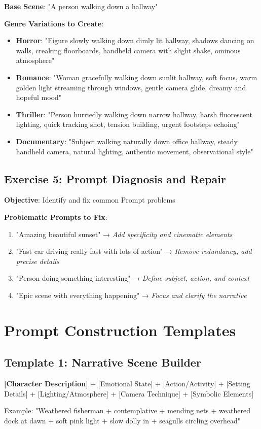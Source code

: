 \textbf{Base Scene}: "A person walking down a hallway"

\textbf{Genre Variations to Create}:
\begin{itemize}
\item \textbf{Horror}: "Figure slowly walking down dimly lit hallway, shadows dancing on walls, creaking floorboards, handheld camera with slight shake, ominous atmosphere"
\item \textbf{Romance}: "Woman gracefully walking down sunlit hallway, soft focus, warm golden light streaming through windows, gentle camera glide, dreamy and hopeful mood"
\item \textbf{Thriller}: "Person hurriedly walking down narrow hallway, harsh fluorescent lighting, quick tracking shot, tension building, urgent footsteps echoing"
\item \textbf{Documentary}: "Subject walking naturally down office hallway, steady handheld camera, natural lighting, authentic movement, observational style"
\end{itemize}

\subsection*{Exercise 5: Prompt Diagnosis and Repair}
\textbf{Objective}: Identify and fix common Prompt problems

\textbf{Problematic Prompts to Fix}:
\begin{enumerate}
\item "Amazing beautiful sunset" → \textit{Add specificity and cinematic elements}
\item "Fast car driving really fast with lots of action" → \textit{Remove redundancy, add precise details}
\item "Person doing something interesting" → \textit{Define subject, action, and context}
\item "Epic scene with everything happening" → \textit{Focus and clarify the narrative}
\end{enumerate}

\section*{Prompt Construction Templates}

\subsection*{Template 1: Narrative Scene Builder}
\begin{Prompt}
\textbf{[Character Description]} + [Emotional State] + [Action/Activity] + [Setting Details] + [Lighting/Atmosphere] + [Camera Technique] + [Symbolic Elements]

Example: "Weathered fisherman + contemplative + mending nets + weathered dock at dawn + soft pink light + slow dolly in + seagulls circling overhead"
\end{Prompt}

